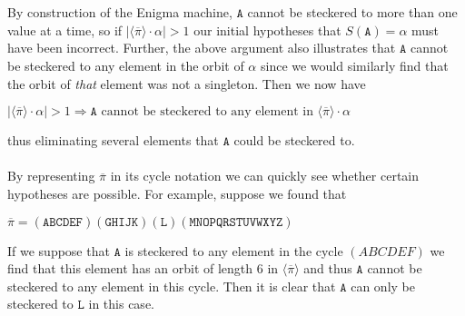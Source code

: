 \\\\By construction of the Enigma machine, $\texttt{A}$ cannot be steckered to
more than one value at a time, so if
$|\langle\overline{\pi}\rangle\cdot\alpha| > 1$ our initial
hypotheses that $S(\texttt{A}) = \alpha$ must have been incorrect. Further,
the above argument also illustrates that $\texttt{A}$ cannot be steckered to
any element in the orbit of $\alpha$ since
we would similarly find that the orbit of \emph{that} element was not a
singleton. Then we now have
\begin{center}
	$|\langle\overline{\pi}\rangle\cdot\alpha| > 1 \Rightarrow
		\texttt{A} \text{ cannot be steckered to any element in
		}\langle\overline{\pi}\rangle\cdot\alpha$
\end{center}
thus eliminating several elements that $\texttt{A}$ could be steckered to.
\\\\By representing $\overline\pi$ in its cycle notation we can
quickly see whether certain hypotheses are possible. For example,
suppose we found that
\begin{center}
	$\overline\pi =
		(\texttt{ABCDEF})(\texttt{GHIJK})(\texttt{L})(\texttt{MNOPQRSTUVWXYZ})$
\end{center}
If we suppose that $\texttt{A}$ is steckered to any element in the cycle
$(ABCDEF)$ we find that this
element has an orbit of length $6$ in $\langle\overline\pi\rangle$
and thus $\texttt{A}$ cannot be steckered
to any element in this cycle. Then it is clear that $\texttt{A}$ can only be
steckered to $\texttt{L}$ in this case.

